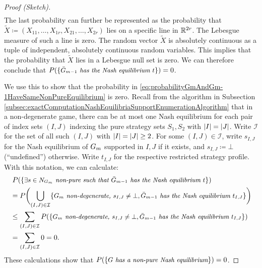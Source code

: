\documentclass[a4paper]{scrreprt}
\theoremstyle{definition}
\begin{document}
\begin{proof}[Proof (Sketch)]
\begin{gather*}
        \end{gather*}
        The last probability can further be represented as the probability that $\tilde{X} \coloneqq (X_{11}, \dots, X_{1r}, X_{21}, \dots, X_{2r})$ lies on a specific line in $\mathbb{R}^{2r}$. The Lebesgue measure of such a line is zero. The random vector $\tilde{X}$ is absolutely continuous as a tuple of independent, absolutely continuous random variables. This implies that the probability that $\tilde{X}$ lies in a Lebesgue null set is zero.
        We can therefore conclude that $P(\{\textit{\small$\bar{G}_{m-1}$ has the Nash equilibrium $t$}\}) = 0$.
        
        We use this to show that the probability in \eqref{eq:probabilityGmAndGm-1HaveSameNonPureEquilibrium} is zero.
        Recall from the algorithm in Subsection \ref{subsec:exactComputationNashEquilibriaSupportEnumerationAlgorithm} that in a non-degenerate game, there can be at most one Nash equilibrium for each pair of index sets $(I, J)$ indexing the pure strategy sets $S_1, S_2$ with $\left| I \right| = \left| J \right|$.
        Write $\mathcal{I}$ for the set of all such $(I, J)$ with $\left| I \right| = \left| J \right| \geq 2$.
        For some $(I, J) \in \mathcal{I}$, write $s_{I,J}$ for the Nash equilibrium of $G_{m}$ supported in $I, J$ if it exists, and $s_{I,J} \coloneqq \bot$ (“undefined”) otherwise. Write $t_{I,J}$ for the respective restricted strategy profile.
        With this notation, we can calculate:
        \begin{align*}
                 &\;P(\{\textit{\small$\exists s \in N_{G_{m}}$ non-pure such that $\bar{G}_{m-1}$ has the Nash equilibrium $t$}\}) \\
                 &= P\biggl(\bigcup_{(I, J) \in \mathcal{I}}\{\textit{\small $G_{m}$ non-degenerate, $s_{I, J} \neq \bot, \bar{G}_{m-1}$ has the Nash equilibrium $t_{I, J}$}\}\biggr) \\
            &\leq \sum_{(I, J) \in \mathcal{I}} 
                P(\{\textit{\small $G_{m}$ non-degenerate, $s_{I, J} \neq \bot, \bar{G}_{m-1}$ has the Nash equilibrium $t_{I, J}$}\}) \\
                &=\sum_{(I, J) \in \mathcal{I}} 0 = 0.
        \end{align*}
        These calculations show that $P(\{\textit{\small $G$ has a non-pure Nash equilibrium}\}) = 0$.
    \end{proof}
    
\end{document}
